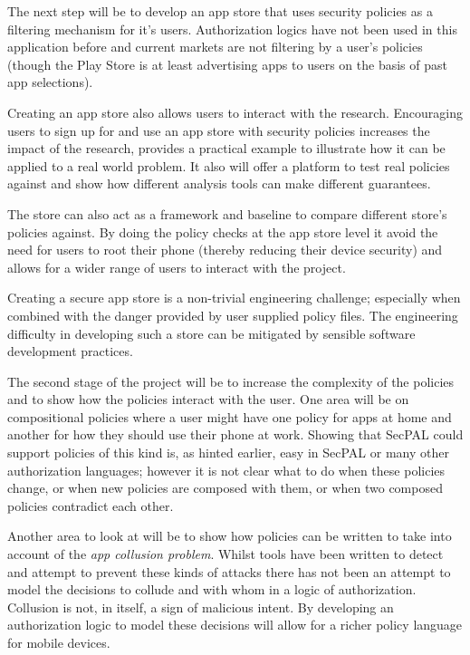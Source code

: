 \documentclass[a4paper,12pt,sfsidenotes]{tufte-book}
\begin{document}
The next step will be to develop an app store that uses security policies as a
filtering mechanism for it's users.  Authorization logics have not been used in
this application before and current markets are not filtering by a user's
policies (though the Play Store is at least advertising apps to users on the
basis of past app selections).

Creating an app store also allows users to interact with the research.
Encouraging users to sign up for and use an app store with security policies
increases the impact of the research, provides a practical example to illustrate
how it can be applied to a real world problem.  It also will offer a platform to
test real policies against and show how different analysis tools can make
different guarantees.  

The store can also act as a framework and baseline to compare different store's
policies against.  By doing the policy checks at the app store level it avoid
the need for users to root their phone (thereby reducing their device security)
and allows for a wider range of users to interact with the project. 

Creating a secure app store is a non-trivial engineering challenge; especially
when combined with the danger provided by user supplied policy files. The
engineering difficulty in developing such a store can be mitigated by sensible
software development practices. 

The second stage of the project will be to increase the complexity of the
policies and to show how the policies interact with the user.  One area will be
on compositional policies where a user might have one policy for apps at home
and another for how they should use their phone at work.  Showing that SecPAL
could support policies of this kind is, as hinted earlier, easy in SecPAL or
many other authorization languages; however it is
not clear what to do when these policies change, or when new policies are
composed with them, or when two composed policies contradict each other.

Another area to look at will be to show how policies can be written to take into
account of the \emph{app collusion problem}.  Whilst tools have been written to
detect and attempt to prevent these kinds of attacks there has not been an
attempt to model the decisions to collude and with whom in a logic of
authorization.  Collusion is not, in itself, a sign of malicious intent.  By
developing an authorization logic to model these decisions will allow for a
richer policy language for mobile devices.
\end{document}

